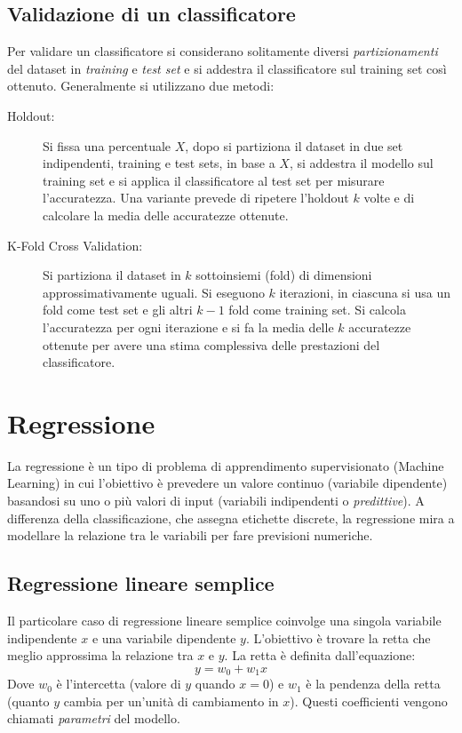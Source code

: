 \subsection{Validazione di un classificatore}
Per validare un classificatore si considerano solitamente diversi \emph{partizionamenti} del dataset in \emph{training} e \emph{test set} e si addestra il classificatore sul training set così ottenuto.
Generalmente si utilizzano due metodi:
\begin{description}
  \item[Holdout:] Si fissa una percentuale $X$, dopo si partiziona il dataset in due set indipendenti, training e test sets, in base a $X$, si addestra il modello sul training set e si applica il classificatore al test set per misurare l'accuratezza. Una variante prevede di ripetere l'holdout $k$ volte e di calcolare la media delle accuratezze ottenute.
  \item[K-Fold Cross Validation:] Si partiziona il dataset in $k$ sottoinsiemi (fold) di dimensioni approssimativamente uguali. Si eseguono $k$ iterazioni, in ciascuna si usa un fold come test set e gli altri $k-1$ fold come training set. Si calcola l'accuratezza per ogni iterazione e si fa la media delle $k$ accuratezze ottenute per avere una stima complessiva delle prestazioni del classificatore.
\end{description}

\section{Regressione}
La regressione è un tipo di problema di apprendimento supervisionato (Machine Learning) in cui l'obiettivo è prevedere un valore continuo (variabile dipendente) basandosi su uno o più valori di input (variabili indipendenti o \emph{predittive}). A differenza della classificazione, che assegna etichette discrete, la regressione mira a modellare la relazione tra le variabili per fare previsioni numeriche.

\subsection{Regressione lineare semplice}
Il particolare caso di regressione lineare semplice coinvolge una singola variabile indipendente $x$ e una variabile dipendente $y$. L'obiettivo è trovare la retta che meglio approssima la relazione tra $x$ e $y$. La retta è definita dall'equazione:
\[
y = w_0 + w_1 x
\]
Dove $w_0$ è l'intercetta (valore di $y$ quando $x=0$) e $w_1$ è la pendenza della retta (quanto $y$ cambia per un'unità di cambiamento in $x$). Questi coefficienti vengono chiamati \emph{parametri} del modello.

